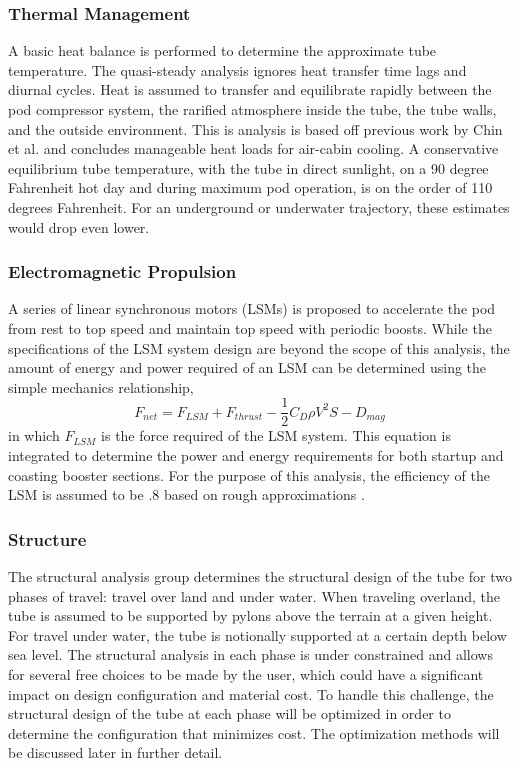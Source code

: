 \subsubsection{Thermal Management}
	A basic heat balance is performed to determine the approximate tube
	temperature. The quasi-steady analysis ignores heat transfer time lags and
	diurnal cycles. Heat is assumed to transfer and equilibrate rapidly
	between the pod compressor system, the rarified atmosphere inside the
	tube, the tube walls, and the outside environment. This is analysis is
	based off previous work by Chin et al.\cite{Chin} and concludes manageable heat
	loads for air-cabin cooling. A conservative equilibrium tube temperature,
	with the tube in direct sunlight, on a 90 degree Fahrenheit hot day and
	during maximum pod operation, is on the order of 110 degrees Fahrenheit.
	For an underground or underwater trajectory, these estimates would drop even lower.
\subsubsection{Electromagnetic Propulsion}
	A series of linear synchronous motors (LSMs) is proposed to accelerate the
	pod from rest to top speed and maintain top speed with periodic boosts.
	While the specifications of the LSM system design are beyond the scope of
	this analysis, the amount of energy and power required of an LSM can be
	determined using the simple mechanics relationship,
	\begin{equation}
		\label{eq:sum_of_forces}
		F_{net} = F_{LSM} + F_{thrust} - \frac{1}{2}C_{D}\rho V^{2}S - D_{mag}
	\end{equation}
	in which $F_{LSM}$ is the force required of the LSM system. This equation
	is integrated to determine the power and energy requirements for both
	startup and coasting booster sections. For the purpose of this analysis,
	the efficiency of the LSM is assumed to be .8 based on rough approximations \cite{LSM}.
\subsubsection{Structure}
	The structural analysis group determines the structural design of the tube
	for two phases of travel: travel over land and under water. When traveling
	overland, the tube is assumed to be supported by pylons above the terrain
	at a given height. For travel under water, the tube is notionally
	supported at a certain depth below sea level. The structural analysis in
	each phase is under constrained and allows for several free choices to be
	made by the user, which could have a significant impact on design
	configuration and material cost. To handle this challenge, the structural
	design of the tube at each phase will be optimized in order to determine
	the configuration that minimizes cost. The optimization methods will be
	discussed later in further detail.


